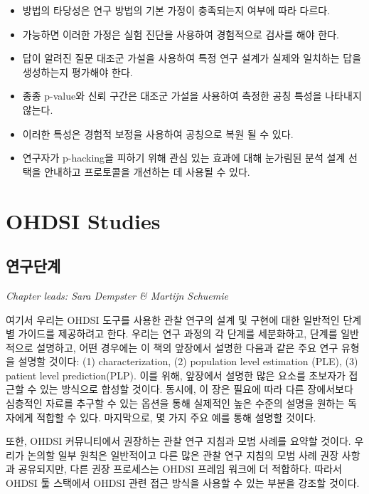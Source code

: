 \documentclass[11pt]{book}
\theoremstyle{definition}
\theoremstyle{definition}
\theoremstyle{definition}
\theoremstyle{remark}
\let\BeginKnitrBlock\begin \let\EndKnitrBlock\end
\begin{document}
\BeginKnitrBlock{rmdsummary}
\begin{itemize}
\item
  방법의 타당성은 연구 방법의 기본 가정이 충족되는지 여부에 따라 다르다.
\item
  가능하면 이러한 가정은 실험 진단을 사용하여 경험적으로 검사를 해야
  한다.
\item
  답이 알려진 질문 대조군 가설을 사용하여 특정 연구 설계가 실제와
  일치하는 답을 생성하는지 평가해야 한다.
\item
  종종 p-value와 신뢰 구간은 대조군 가설을 사용하여 측정한 공칭 특성을
  나타내지 않는다.
\item
  이러한 특성은 경험적 보정을 사용하여 공칭으로 복원 될 수 있다.
\item
  연구자가 p-hacking을 피하기 위해 관심 있는 효과에 대해 눈가림된 분석
  설계 선택을 안내하고 프로토콜을 개선하는 데 사용될 수 있다.
\end{itemize}
\EndKnitrBlock{rmdsummary}

\part{OHDSI Studies}\label{part-ohdsi-studies}

\chapter{연구단계}\label{StudySteps}

\emph{Chapter leads: Sara Dempster \& Martijn Schuemie}

여기서 우리는 OHDSI 도구를 사용한 관찰 연구의 설계 및 구현에 대한
일반적인 단계별 가이드를 제공하려고 한다. 우리는 연구 과정의 각 단계를
세분화하고, 단계를 일반적으로 설명하고, 어떤 경우에는 이 책의 앞장에서
설명한 다음과 같은 주요 연구 유형을 설명할 것이다: (1) characterization,
(2) population level estimation (PLE), (3) patient level
prediction(PLP). 이를 위해, 앞장에서 설명한 많은 요소를 초보자가 접근할
수 있는 방식으로 합성할 것이다. 동시에, 이 장은 필요에 따라 다른
장에서보다 심층적인 자료를 추구할 수 있는 옵션을 통해 실제적인 높은
수준의 설명을 원하는 독자에게 적합할 수 있다. 마지막으로, 몇 가지 주요
예를 통해 설명할 것이다.

또한, OHDSI 커뮤니티에서 권장하는 관찰 연구 지침과 모범 사례를 요약할
것이다. 우리가 논의할 일부 원칙은 일반적이고 다른 많은 관찰 연구 지침의
모범 사례 권장 사항과 공유되지만, 다른 권장 프로세스는 OHDSI 프레임
워크에 더 적합하다. 따라서 OHDSI 툴 스택에서 OHDSI 관련 접근 방식을
사용할 수 있는 부분을 강조할 것이다.
\end{document}
